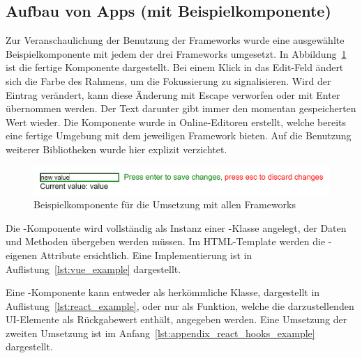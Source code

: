 \subsection{Aufbau von Apps (mit Beispielkomponente)}
Zur Veranschaulichung der Benutzung der Frameworks wurde eine ausgewählte Beispielkomponente mit jedem der drei Frameworks umgesetzt. In Abbildung~\ref{fig:example_component} ist die fertige Komponente dargestellt. Bei einem Klick in das Edit-Feld ändert sich die Farbe des Rahmens, um die Fokussierung zu signalisieren. Wird der Eintrag verändert, kann diese Änderung mit Escape verworfen oder mit Enter übernommen werden. Der Text darunter gibt immer den momentan gespeicherten Wert wieder. Die Komponente wurde in Online-Editoren erstellt, welche bereits eine fertige Umgebung mit dem jeweiligen Framework bieten. Auf die Benutzung weiterer Bibliotheken wurde hier explizit verzichtet.

\begin{figure}
    \centering
    \captionsetup{justification=centering}
    \includegraphics[width=\textwidth]{figures/example_component.png}
        \caption{Beispielkomponente für die Umsetzung mit allen Frameworks}\label{fig:example_component}
\end{figure}

Die -Komponente wird vollständig als Instanz einer -Klasse angelegt, der Daten und Methoden übergeben werden müssen. Im HTML-Template werden die -eigenen Attribute ersichtlich. Eine Implementierung ist in Auflistung~\ref{lst:vue_example} dargestellt.



Eine -Komponente kann entweder als herkömmliche Klasse, dargestellt in Auflistung~\ref{lst:react_example}, oder nur als Funktion, welche die darzustellenden UI-Elemente als Rückgabewert enthält, angegeben werden. Eine Umsetzung der zweiten Umsetzung ist im Anfang~\ref{lst:appendix_react_hooks_example} dargestellt.



